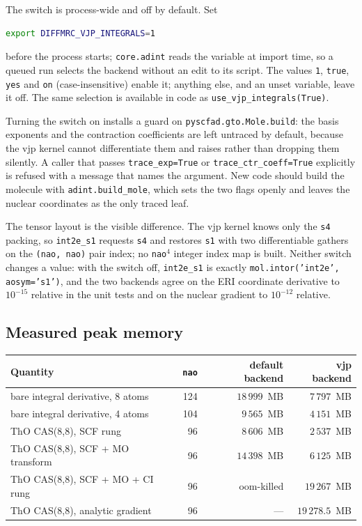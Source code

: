 The switch is process-wide and off by default.  Set

\begin{lstlisting}[language=bash]
export DIFFMRC_VJP_INTEGRALS=1
\end{lstlisting}

before the process starts; \texttt{core.adint} reads the variable at
import time, so a queued run selects the backend without an edit to
its script.  The values \texttt{1}, \texttt{true}, \texttt{yes} and
\texttt{on} (case-insensitive) enable it; anything else, and an unset
variable, leave it off.  The same selection is available in code as
\texttt{use\_vjp\_integrals(True)}.

Turning the switch on installs a guard on
\texttt{pyscfad.gto.Mole.build}: the basis exponents and the
contraction coefficients are left untraced by default, because the
vjp kernel cannot differentiate them and raises rather than dropping
them silently.  A caller that passes \texttt{trace\_exp=True} or
\texttt{trace\_ctr\_coeff=True} explicitly is refused with a message
that names the argument.  New code should build the molecule with
\texttt{adint.build\_mole}, which sets the two flags openly and leaves
the nuclear coordinates as the only traced leaf.

The tensor layout is the visible difference.  The vjp kernel knows
only the \texttt{s4} packing, so \texttt{int2e\_s1} requests
\texttt{s4} and restores \texttt{s1} with two differentiable gathers
on the \texttt{(nao, nao)} pair index; no \texttt{nao}$^4$ integer
index map is built.  Neither switch changes a value: with the switch
off, \texttt{int2e\_s1} is exactly
\texttt{mol.intor('int2e', aosym='s1')}, and the two backends agree on
the ERI coordinate derivative to $10^{-15}$ relative in the unit tests
and on the nuclear gradient to $10^{-12}$ relative.

\subsection{Measured peak memory}

\begin{center}
\begin{tabular}{lrrr}
\toprule
Quantity & \texttt{nao} & default backend & vjp backend \\
\midrule
bare integral derivative, 8 atoms & 124 & $18\,999$~MB & $7\,797$~MB \\
bare integral derivative, 4 atoms & 104 & $9\,565$~MB & $4\,151$~MB \\
ThO CAS(8,8), SCF rung & 96 & $8\,606$~MB & $2\,537$~MB \\
ThO CAS(8,8), SCF + MO transform & 96 & $14\,398$~MB & $6\,125$~MB \\
ThO CAS(8,8), SCF + MO + CI rung & 96 & oom-killed & $19\,267$~MB \\
ThO CAS(8,8), analytic gradient & 96 & --- & $19\,278.5$~MB \\
\bottomrule
\end{tabular}
\end{center}

